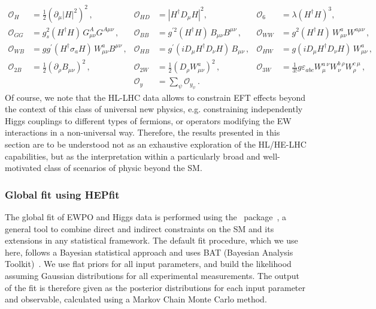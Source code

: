 \begin{align}
\label{eq:universal}
%
\mathcal{O}_{H} &=  
\frac{1}{2}(\partial_\mu \vert H \vert^2)^2 \,,
&
\mathcal{O}_{H D} &= 
|H^\dagger D_\mu H|^2 ,
&
\mathcal{O}_{6} &= 
\lambda (H^\dagger H)^3,  \nonumber \\
%
\mathcal{O}_{G G} &= 
g_s^2(H^\dagger H) \, G^A_{\mu\nu} G^{A\mu\nu}  \, ,
&
\mathcal{O}_{B B} &= 
g^{\prime 2}(H^\dagger H) \, B_{\mu\nu} B^{\mu\nu}  \, ,
&
\mathcal{O}_{W W} &= 
g^2(H^\dagger H) \, W^a_{\mu\nu} W^{a\mu\nu} \, ,\nonumber\\
%
\mathcal{O}_{W B} &= 
gg^{\prime}(H^\dagger \sigma_a H) \, W^a_{\mu\nu} B^{\mu\nu} \, ,
&
\mathcal{O}_{HB} &= 
g^\prime(i D_\mu H^\dagger D_\nu H) \, B_{\mu\nu} \, ,
&
\mathcal{O}_{HW} &= 
g(i D_\mu H^\dagger D_\nu H) \, W^a_{\mu\nu} \, ,\nonumber\\
%
\mathcal{O}_{2B} &= 
\frac 12 (\partial_\rho B_{\mu\nu})^2  \, ,
&
\mathcal{O}_{2W} &= 
\frac 12 (D_\rho W^a_{\mu\nu})^2  \, ,
&
\mathcal{O}_{3W} &= 
\frac{1}{3!}g\varepsilon_{abc} W_{\mu}^{a~\nu} W_{\nu}^{b~\rho} W_{\rho}^{c~\mu} \, ,\nonumber\\
%
&&
\mathcal{O}_{y} &= 
\sum_\psi \mathcal{O}_{y_\psi} \, .
& &
\end{align}
%
Of course, we note that the HL-LHC data allows to constrain EFT effects beyond the context of this class of universal new physics, 
e.g. constraining independently Higgs couplings to different types of fermions, or operators modifying the EW interactions
in a non-universal way. Therefore, the results presented in this section are to be understood not as an exhaustive exploration 
of the HL/HE-LHC capabilities, but as the interpretation within a particularly broad and well-motivated class
of scenarios of physic beyond the SM.


\subsubsection{Global fit using HEPfit}
\label{sec:global-fit}

The global fit of EWPO and Higgs data is performed using the
\HEPfit~package~\cite{hepfitsite}, a general tool to combine direct
and indirect constraints on the SM and its extensions in any
statistical framework.  The default fit procedure, which we use here,
follows a Bayesian statistical approach and uses BAT (Bayesian
Analysis Toolkit)~\cite{Caldwell:2008fw}. We use flat priors for all
input parameters, and build the likelihood assuming Gaussian
distributions for all experimental measurements. The output of the fit
is therefore given as the posterior distributions for each input
parameter and observable, calculated using a Markov Chain Monte
Carlo method.

